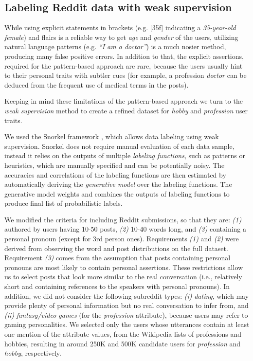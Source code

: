 
\subsection{Labeling Reddit data with weak supervision}
\label{data_snorkel}

While using explicit statements in brackets (e.g. [35f] indicating a \textit{35-year-old female}) and flairs is a reliable way to get \textit{age} and \textit{gender} of the users, utilizing natural language patterns (e.g. \textit{``I am a doctor''}) is a much nosier method, producing many false positive errors. In addition to that, the explicit assertions, required for the pattern-based approach are rare, because the users usually hint to their personal traits with subtler cues (for example, a profession \textit{doctor} can be deduced from the frequent use of medical terms in the posts). 

Keeping in mind these limitations of the pattern-based approach we turn to the \textit{weak supervision} method to create a refined dataset for \textit{hobby} and \textit{profession} user traits. 

 We used the Snorkel framework \cite{ratner2017snorkel}, which allows data labeling using weak supervision. 
Snorkel does not require manual evaluation of each data sample, instead it relies on the outputs of multiple \textit{labeling functions}, such as patterns or heuristics, which are manually specified and can be potentially noisy. The accuracies and correlations of the labeling functions are then estimated by automatically deriving the \textit{generative model} over the labeling functions. The generative model weights and combines the outputs of labeling functions to produce final list of probabilistic labels.

\vspace{10pt}

We modified the criteria for including Reddit submissions, so that they are:
\emph{(1)} authored by users having 10-50 posts, \emph{(2)} 10-40 words long, and \emph{(3)} containing a personal pronoun (except for 3rd person ones).
Requirements \emph{(1)} and \emph{(2)} were derived from observing the word and post distributions on the full dataset.
Requirement \emph{(3)} comes from the assumption that posts containing personal pronouns are most likely to contain personal assertions. These restrictions allow us to select posts that look more similar to the real conversation (i.e., relatively short and containing references to the speakers with personal pronouns).
In addition, we did not consider the following subreddit types: \emph{(i)} \emph{dating}, which may provide plenty of personal information but no real conversation to infer from,
and \emph{(ii)} \emph{fantasy/video games} (for the \emph{profession} attribute), because users may refer to gaming personalities.
We selected only the users whose utterances contain at least one mention of the attribute values, from the Wikipedia lists of professions and hobbies,
resulting in around 250K and 500K candidate users for \textit{profession} and \textit{hobby}, respectively.

